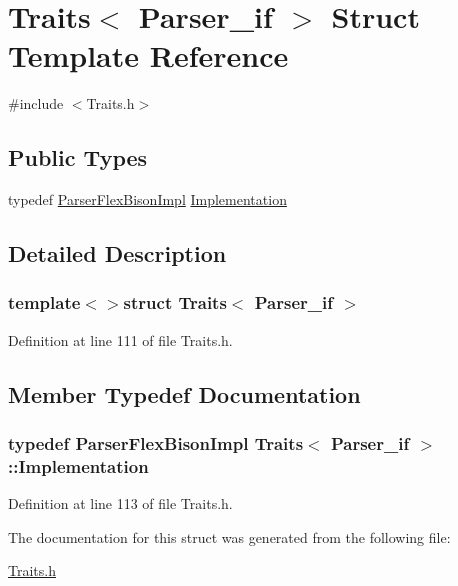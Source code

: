 \hypertarget{struct_traits_3_01_parser__if_01_4}{\section{Traits$<$ Parser\-\_\-if $>$ Struct Template Reference}
\label{struct_traits_3_01_parser__if_01_4}
}


{\ttfamily \#include $<$Traits.\-h$>$}

\subsection*{Public Types}
\begin{DoxyCompactItemize}
\item 
typedef \hyperlink{class_parser_flex_bison_impl}{Parser\-Flex\-Bison\-Impl} \hyperlink{struct_traits_3_01_parser__if_01_4_ac4b3058438c07381c066f9a376c01b05}{Implementation}
\end{DoxyCompactItemize}


\subsection{Detailed Description}
\subsubsection*{template$<$$>$struct Traits$<$ Parser\-\_\-if $>$}



Definition at line 111 of file Traits.\-h.



\subsection{Member Typedef Documentation}
\hypertarget{struct_traits_3_01_parser__if_01_4_ac4b3058438c07381c066f9a376c01b05}{
\subsubsection[{Implementation}]{\setlength{\rightskip}{0pt plus 5cm}typedef {\bf Parser\-Flex\-Bison\-Impl} {\bf Traits}$<$ {\bf Parser\-\_\-if} $>$\-::{\bf Implementation}}}\label{struct_traits_3_01_parser__if_01_4_ac4b3058438c07381c066f9a376c01b05}


Definition at line 113 of file Traits.\-h.



The documentation for this struct was generated from the following file\-:\begin{DoxyCompactItemize}
\item 
\hyperlink{_traits_8h}{Traits.\-h}\end{DoxyCompactItemize}
